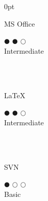 \documentclass[a4paper]{article}
\begin{document}
\begin{adjustwidth}{\parindent}{0pt}
\begin{minipage}[t]{0.25\textwidth}
 \begin{minipage}{0.65\textwidth}
  \small{MS Office}
\end{minipage}
\begin{minipage}{0.3\textwidth}
  \centering $\mdlgblkcircle$ $\mdlgblkcircle$ $\mdlgwhtcircle$ \\  \footnotesize{\mbox{Intermediate}}
\end{minipage} \\ \hspace{0pt} \\

\begin{minipage}{0.65\textwidth}
  \small{\LaTeX}
\end{minipage}
\begin{minipage}{0.3\textwidth}
  \centering $\mdlgblkcircle$ $\mdlgblkcircle$ $\mdlgwhtcircle$ \\  \footnotesize{\mbox{Intermediate}}
\end{minipage} \\ \hspace{0pt} \\

 \begin{minipage}{0.65\textwidth}
  \small{SVN}
 \end{minipage}
 \begin{minipage}{0.3\textwidth}
  \centering $\mdlgblkcircle$ $\mdlgwhtcircle$ $\mdlgwhtcircle$ \\  \footnotesize{Basic}
 \end{minipage} \\ \hspace{0pt} \\

\end{minipage}
\end{adjustwidth}
\end{document}

